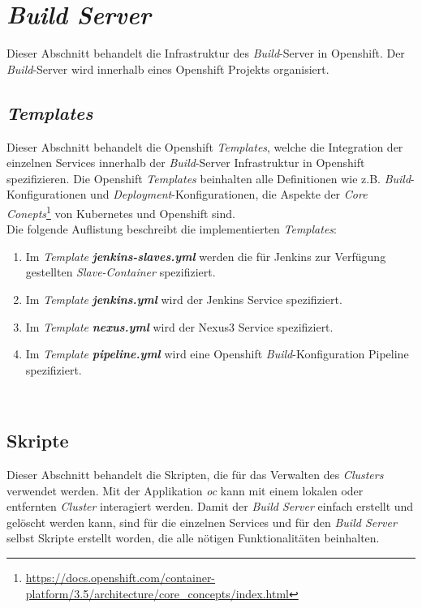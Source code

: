 \section{\emph{Build Server}}
\label{sec:buildserver}
Dieser Abschnitt behandelt die Infrastruktur des \emph{Build}-Server in Openshift. Der \emph{Build}-Server wird innerhalb eines Openshift Projekts organisiert.

\subsection{\emph{Templates}}
\label{sec:openshift-templates}
Dieser Abschnitt behandelt die Openshift \emph{Templates}, welche die Integration der einzelnen Services innerhalb der \emph{Build}-Server Infrastruktur in Openshift spezifizieren. Die Openshift \emph{Templates} beinhalten alle Definitionen wie z.B. \emph{Build}-Konfigurationen und \emph{Deployment}-Konfigurationen, die Aspekte der \emph{Core Conepts}\footnote{\url{https://docs.openshift.com/container-platform/3.5/architecture/core_concepts/index.html}} von Kubernetes und Openshift sind. \\

Die folgende Auflistung beschreibt die implementierten \emph{Templates}:
\begin{enumerate}
	\item Im \emph{Template} \textbf{\emph{jenkins-slaves.yml}} werden die für Jenkins zur Verfügung gestellten \emph{Slave-Container} spezifiziert.
	\item Im \emph{Template} \textbf{\emph{jenkins.yml}} wird der Jenkins Service spezifiziert.
	\item Im \emph{Template} \textbf{\emph{nexus.yml}} wird der Nexus3 Service spezifiziert.
	\item Im \emph{Template} \textbf{\emph{pipeline.yml}} wird eine Openshift \emph{Build}-Konfiguration Pipeline spezifiziert.
\end{enumerate}

\ \subsection{Skripte}
Dieser Abschnitt behandelt die Skripten, die für das Verwalten des \emph{Clusters} verwendet werden. Mit der Applikation \emph{oc} kann mit einem lokalen oder entfernten \emph{Cluster} interagiert werden. Damit der \emph{Build Server} einfach erstellt und gelöscht werden kann, sind für die einzelnen Services und für den \emph{Build Server} selbst
Skripte erstellt worden, die alle nötigen Funktionalitäten beinhalten.\\

